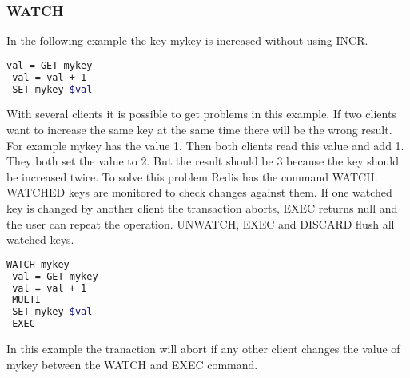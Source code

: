 \subsubsection{WATCH}
In the following example the key mykey is increased without using INCR.
\begin{lstlisting}[language=bash]
 val = GET mykey
 val = val + 1
 SET mykey $val
\end{lstlisting}
With several clients it is possible to get problems in this example. If two clients want to increase the same key at the same time there will be the wrong result. For example mykey has the value 1. Then both clients read this value and add 1. They both set the value to 2. But the result should be 3 because the key should be increased twice.
\newline
To solve this problem Redis has the command WATCH. WATCHED keys are monitored to check changes against them. If one watched key is changed by another client the transaction aborts, EXEC returns null and the user can repeat the operation. UNWATCH, EXEC and DISCARD flush all watched keys.

\begin{lstlisting}[language=bash]
 WATCH mykey
 val = GET mykey
 val = val + 1
 MULTI
 SET mykey $val
 EXEC
\end{lstlisting}
In this example the tranaction will abort if any other client changes the value of mykey between the WATCH and EXEC command. \cite{RedisTransactions}

